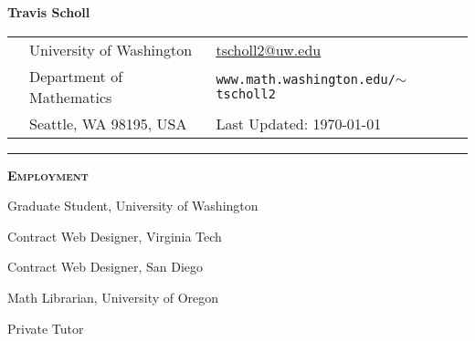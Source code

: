\documentclass[12pt]{article}
\newcommand{\sectionheading}[1]
{
\bigskip %
\noindent
\hspace{-6.5mm}\textcolor{Gray}{\rule[.75mm]{21.5mm}{1mm}} %
\hspace{.2mm}	%
{\large{\textbf{\textsc{#1}}}} %
}
\newenvironment{date_section}
	{
	\vspace{-1ex}
	\leftmargini = 15ex
		\begin{itemize}[
			labelsep = *,
			labelwidth = 9ex,
			labelindent = 0ex,
			itemindent = !,
			font=\normalfont,
			align=parleft
		]{}
		\itemsep=-1.5mm
	}
	{\end{itemize}\vspace{-2ex}}
\newcommand{\yearrange}[2]{
	\item[
		{\makebox[1ex][r]{#1}}
		--
		{\makebox[1ex][l]{#2} }
		] }
\begin{document}

	\thispagestyle{empty}

	\centerline{{\LARGE \textbf{Travis Scholl}}}

	\vspace{3mm}

	\begin{center}
		\begin{tabular}[c]{lll} %
			\phantom{aaaaaaaaa} %
			& University of Washington
				& \url{tscholl2@uw.edu} \\
 			& Department of Mathematics
				& \texttt{www.math.washington.edu/$\sim$tscholl2}\\
 			& Seattle, WA 98195, USA
				& Last Updated: \today
		\end{tabular}
	\end{center}


	\sectionheading{Employment}%

		\begin{date_section}

			\yearrange{2013}{} Graduate Student,  University of Washington

			\yearrange{2015}{2015} Contract Web Designer, Virginia Tech

			\yearrange{2013}{2014} Contract Web Designer, San Diego

			\yearrange{2012}{2013} Math Librarian, University of Oregon

			\yearrange{2007}{2013} Private Tutor





		\end{date_section}
\end{document}
